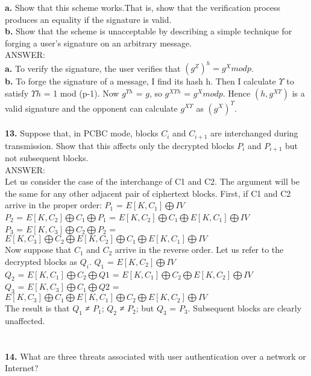 \documentclass[paper=a4, fontsize=11pt]{scrartcl} %
\numberwithin{equation}{section} %
\numberwithin{figure}{section} %
\numberwithin{table}{section} %
\begin{document}
\textbf{a.} Show that this scheme works.That is, show that the verification process produces an equality if the signature is valid.\\
\textbf{b. }Show that the scheme is unacceptable by describing a simple technique for forging a user’s signature on an arbitrary message.\\

ANSWER:\\
\textbf{a.}     To verify the signature, the user verifies that $(g^{Z})^{h} = g^{X} mod p$.\\
\textbf{b.}     To forge the signature of a message, I find its hash h. Then I calculate $\Upsilon$ to satisfy $\Upsilon h$ = 1 mod (p-1). Now $g^{\Upsilon h}$ = $g$, so $g^{X\Upsilon h}$ = $g^{X} mod p$. Hence $(h, g^{X\Upsilon})$ is a valid signature and the opponent can calculate $g^{X\Upsilon}$ as $(g^{X})^{\Upsilon}$.
\\
\\
\textbf{13.} Suppose that, in PCBC mode, blocks $C_{i}$ and $C_{i+1}$ are interchanged during transmission. Show that this affects only the decrypted blocks $P_{i}$ and $P_{i+1}$  but not subsequent blocks.\\

ANSWER:\\
Let us consider the case of the interchange of C1 and C2. The argument will be the same for any other adjacent pair of ciphertext blocks. First, if C1 and C2 arrive in the proper order:
        $P_{1}$ = $E[K, C_{1}] \bigoplus IV$\\
        $P_{2}$ = $E[K, C_{2}] \bigoplus C_{1} \bigoplus P_{1}$ = $E[K, C_{2}] \bigoplus C_{1} \bigoplus E[K, C_{1}] \bigoplus IV$\\
        $P_{3}$ = $E[K, C_{3}] \bigoplus C_{2} \bigoplus P_{2}$ = $E[K, C_{3}] \bigoplus C_{2} \bigoplus E[K, C_{2}] \bigoplus C_{1} \bigoplus E[K, C_{1}] \bigoplus IV$\\
Now suppose that $C_{1}$ and $C_{2}$ arrive in the reverse order. Let us refer to the decrypted blocks as $Q_{i}$.
        $Q_{1}$ =       $E[K, C_{2}] \bigoplus IV$\\
        $Q_{2}$ =       $E[K, C_{1}] \bigoplus C_{2} \bigoplus Q1$ = $E[K, C_{1}] \bigoplus C_{2} \bigoplus E[K, C_{2}] \bigoplus IV$\\
        $Q_{3}$ =       $E[K, C_{3}] \bigoplus C_{1} \bigoplus Q2$ = $E[K, C_{3}] \bigoplus C_{1} \bigoplus E[K, C_{1}] \bigoplus C_{2} \bigoplus E[K, C_{2}] \bigoplus IV$\\
The result is that $Q_{1}$ ≠ $P_{1}$;  $Q_{2}$ ≠ $P_{2}$; but $Q_{3}$ = $P_{3}$. Subsequent blocks are clearly unaffected.\\
\\
\\
\textbf{14.} What are three threats associated with user authentication over a network or Internet?\\
\end{document}
